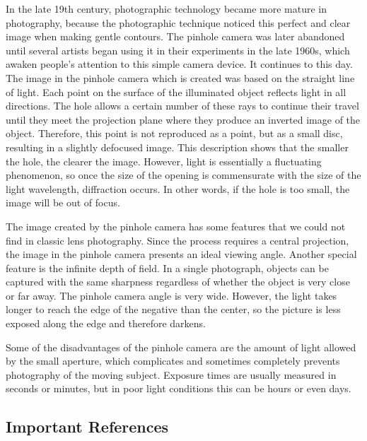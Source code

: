\documentclass[11pt]{article}
\begin{document}
In the late 19th century, photographic technology became more mature in photography, because the photographic technique noticed this perfect and clear image when making gentle contours. The pinhole camera was later abandoned until several artists began using it in their experiments in the late 1960s, which awaken people's attention to this simple camera device. It continues to this day. The image in the pinhole camera which is created was based on the straight line of light. Each point on the surface of the illuminated object reflects light in all directions. The hole allows a certain number of these rays to continue their travel until they meet the projection plane where they produce an inverted image of the object. Therefore, this point is not reproduced as a point, but as a small disc, resulting in a slightly defocused image. This description shows that the smaller the hole, the clearer the image. However, light is essentially a fluctuating phenomenon, so once the size of the opening is commensurate with the size of the light wavelength, diffraction occurs. In other words, if the hole is too small, the image will be out of focus.

The image created by the pinhole camera has some features that we could not find in classic lens photography. Since the process requires a central projection, the image in the pinhole camera presents an ideal viewing angle. Another special feature is the infinite depth of field. In a single photograph, objects can be captured with the same sharpness regardless of whether the object is very close or far away. The pinhole camera angle is very wide. However, the light takes longer to reach the edge of the negative than the center, so the picture is less exposed along the edge and therefore darkens.

Some of the disadvantages of the pinhole camera are the amount of light allowed by the small aperture, which complicates and sometimes completely prevents photography of the moving subject. Exposure times are usually measured in seconds or minutes, but in poor light conditions this can be hours or even days.

\subsection{Important References}
\end{document}
